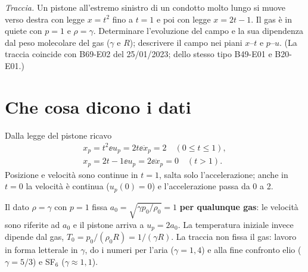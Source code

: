 

\graphicspath{{../../svolgimenti/1970-02-01_E02_pistone_parabolico/figure/}}

\newcommand{\uma}{u-a}
\newcommand{\upa}{u+a}



\maketitle

\emph{Traccia.} Un pistone all'estremo sinistro di un condotto molto lungo si muove verso destra con legge $x=t^2$
fino a $t=1$ e poi con legge $x=2t-1$. Il gas è in quiete con $p=1$ e $\rho=\gamma$. Determinare l'evoluzione del
campo e la sua dipendenza dal peso molecolare del gas ($\gamma$ e $R$); descrivere il campo nei piani $x$--$t$ e
$p$--$u$. (La traccia coincide con B69-E02 del 25/01/2023; dello stesso tipo B49-E01 e B20-E01.)

\section*{Che cosa dicono i dati}
Dalla legge del pistone ricavo
\begin{gather*}
x_p=t^2 \ee u_p=2t \ee \ddot x_p=2\quad(0\le t\le1),\\
x_p=2t-1 \ee u_p=2 \ee \ddot x_p=0\quad(t>1).
\end{gather*}
Posizione e velocità sono continue in $t=1$, salta solo l'accelerazione; anche in $t=0$ la velocità è continua
($u_p(0)=0$) e l'accelerazione passa da 0 a 2.

Il dato $\rho=\gamma$ con $p=1$ fissa $a_0=\sqrt{\gamma p_0/\rho_0}=1$ \textbf{per qualunque gas}: le velocità sono
riferite ad $a_0$ e il pistone arriva a $u_p=2a_0$. La temperatura iniziale invece dipende dal gas,
$T_0=p_0/(\rho_0R)=1/(\gamma R)$. La traccia non fissa il gas: lavoro in forma letterale in $\gamma$, do i numeri per
l'aria ($\gamma=1{,}4$) e alla fine confronto elio ($\gamma=5/3$) e SF$_6$ ($\gamma\approx1{,}1$).

